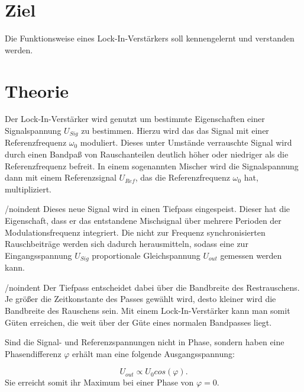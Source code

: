 \section{Ziel}
\label{sec:Ziel}

Die Funktionsweise eines Lock-In-Verstärkers soll kennengelernt und verstanden werden. 

\section{Theorie}
\label{sec:Theorie}

Der Lock-In-Verstärker wird genutzt um bestimmte Eigenschaften einer Signalspannung $U_{Sig}$ zu bestimmen.
Hierzu wird das das Signal mit einer Referenzfrequenz $\omega_0$ moduliert.
Dieses unter Umstände verrauschte Signal wird durch einen Bandpaß von Rauschanteilen deutlich höher oder niedriger als die Referenzfrequenz befreit. 
In einem sogenannten Mischer wird die Signalspannung dann mit einem Referenzsignal $U_{Ref}$, das die Referenzfrequenz $\omega_0$ hat, multipliziert. 

/noindent Dieses neue Signal wird in einen Tiefpass eingespeist. Dieser hat die Eigenschaft, dass er das entstandene Mischsignal über mehrere Perioden der Modulationsfrequenz integriert.
Die nicht zur Frequenz synchronisierten Rauschbeiträge werden sich dadurch herausmitteln, sodass eine zur Eingangsspannung $U_{Sig}$ proportionale Gleichspannung $U_{out}$ gemessen werden kann. 

/noindent Der Tiefpass entscheidet dabei über die Bandbreite des Restrauschens. Je größer die Zeitkonstante des Passes gewählt wird, desto kleiner wird die Bandbreite des Rauschens sein. Mit einem Lock-In-Verstärker kann man somit Güten erreichen, die weit über der Güte eines normalen Bandpasses liegt. 

Sind die Signal- und Referenzspannungen nicht in Phase, sondern haben eine Phasendifferenz $\varphi$ erhält man eine folgende Ausgangsspannung: 

\begin{equation}
    U_{out} \propto U_0 cos(\varphi).
\end{equation}
Sie erreicht somit ihr Maximum bei einer Phase von $\varphi = 0$. 
